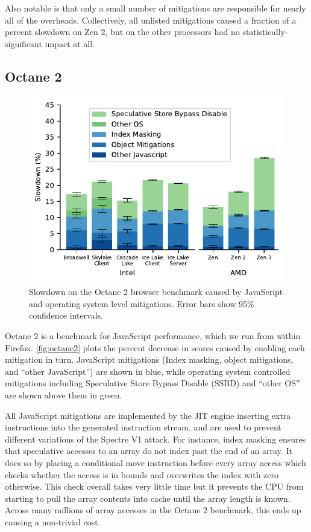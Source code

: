 Also notable is that only a small number of mitigations are responsible for nearly all of the overheads.
Collectively, all unlisted mitigations caused a fraction of a percent slowdown on Zen 2, but on the other processors had no statistically-significant impact at all.

\subsection{Octane 2}
\label{sec:benchmarks:octane-2}

\begin{figure}[h]
    \includegraphics[width=\columnwidth]{plots/octane2.pdf}
    \caption{Slowdown on the Octane 2 browser benchmark caused by JavaScript and operating system level mitigations. Error bars show 95\% confidence intervals.}
    \label{fig:octane2}
\end{figure}

Octane 2 is a benchmark for JavaScript performance, which we run from within Firefox.
\autoref{fig:octane2} plots the percent decrease in scores caused by enabling each mitigation in turn.
JavaScript mitigations (Index masking, object mitigations, and ``other JavaScript'') are shown in blue, while operating system controlled mitigations including Speculative Store Bypass Disable (SSBD) and ``other OS'' are shown above them in green.

All JavaScript mitigations are implemented by the JIT engine inserting extra instructions into the generated instruction stream, and are used to prevent different variations of the Spectre V1 attack.
For instance, index masking ensures that speculative accesses to an array do not index past the end of an array.
It does so by placing a conditional move instruction before every array access which checks whether the access is in bounds and overwrites the index with zero otherwise.
This check overall takes very little time but it prevents the CPU from starting to pull the array contents into cache until the array length is known.
Across many millions of array accesses in the Octane 2 benchmark, this ends up causing a non-trivial cost.

